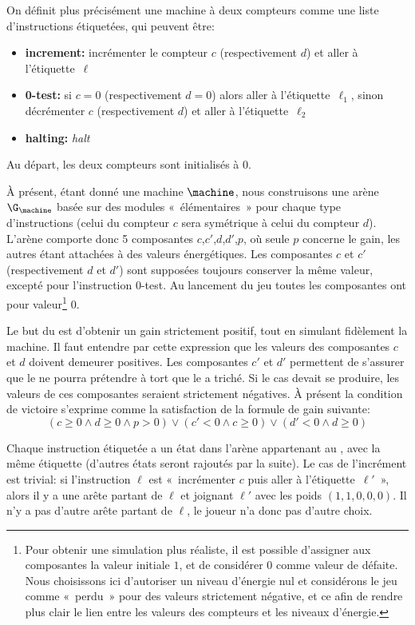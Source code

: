 On définit plus précisément une machine à deux compteurs comme une liste d'instructions étiquetées, qui peuvent être:
\begin{itemize}
    \item \textbf{increment:} incrémenter le compteur $c$ (respectivement $d$) et aller à l'étiquette~$\ell$
    \item \textbf{0-test:} si $c=0$ (respectivement $d=0$) alors aller à l'étiquette~$\ell_1$, sinon décrémenter $c$ (respectivement $d$) et aller à l'étiquette~$\ell_2$
    \item \textbf{halting:} \emph{halt}
\end{itemize}
Au départ, les deux compteurs sont initialisés à $0$.

À présent, étant donné une machine $\machine$, nous construisons une arène $\G_\machine$ basée sur des modules « élémentaires » pour chaque type d'instructions (celui du compteur $c$ sera symétrique à celui du compteur $d$).
L'arène comporte donc 5 composantes $c$,$c'$,$d$,$d'$,$p$, où seule $p$ concerne le gain, les autres étant attachées à des valeurs énergétiques.
Les composantes $c$ et $c'$ (respectivement $d$ et $d'$) sont supposées toujours conserver la même valeur, excepté pour l'instruction $0$-test.
Au lancement du jeu toutes les composantes ont pour valeur\footnote{Pour obtenir une simulation plus réaliste, il est possible d'assigner aux composantes la valeur initiale $1$, et de considérer $0$ comme valeur de défaite. Nous choisissons ici d'autoriser un niveau d'énergie nul et considérons le jeu comme « perdu » pour des valeurs strictement négative, et ce afin de rendre plus clair le lien entre les valeurs des compteurs et les niveaux d'énergie.} $0$.

Le but du \jo est d'obtenir un gain strictement positif, tout en simulant fidèlement la machine.
Il faut entendre par cette expression que les valeurs des composantes $c$ et $d$ doivent demeurer positives.
Les composantes $c'$ et $d'$ permettent de s'assurer que le \ji ne pourra prétendre à tort que le \jo a triché.
Si le cas devait se produire, les valeurs de ces composantes seraient strictement négatives.
À présent la condition de victoire s'exprime comme la satisfaction de la formule de gain suivante:
\[(c\geq0 \wedge d\geq0 \wedge p>0) \vee (c'<0 \wedge c\geq0) \vee (d'<0 \wedge d\geq0)\]

Chaque instruction étiquetée a un état dans l'arène appartenant au \jo, avec la même étiquette (d'autres états seront rajoutés par la suite).
Le cas de l'incrément est trivial: si l'instruction $\ell$ est « incrémenter $c$ puis aller à l'étiquette~$\ell'$ », alors il y a une arête partant de $\ell$ et joignant $\ell'$ avec les poids $(1,1,0,0,0)$.
Il n'y a pas d'autre arête partant de $\ell$, le joueur n'a donc pas d'autre choix.

